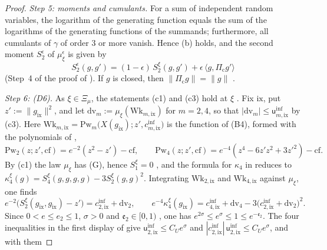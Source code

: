 \documentclass[11pt]{amsart}
\theoremstyle{definition}
\begin{document}
\begin{proof}
\emph{Step 5: moments and cumulants.}
For a sum of independent random variables, the logarithm of the generating function equals the sum of the logarithms of the generating functions of the summands; furthermore, all cumulants of $\gamma$ of order $3$ or more vanish.
Hence (b) holds, and the second moment $S_2^\epsilon$ of $\mu_\xi^\epsilon$ is given by
\begin{equation*}
S_2^{\epsilon}(g,g')=(1-\epsilon)\,S_2^\xi(g,g')+\epsilon\,\langle g,\Pi_{\mathrm c}g'\rangle
\end{equation*}
(Step~4 of the proof of \cite[Proposition~21.40\,(a)]{QEDI}).
If $g$ is closed, then $\|\Pi_{\mathrm c}g\|=\|g\|$ \cite[Lemma~9.12\,(a)]{QEDI}.

\emph{Step 6: (D6).}
As $\xi\in\Xi_\mu$, the statements (c1) and (c3) hold at $\xi$ \cite[Theorem~44\,(D)]{QEDIII}.
Fix $\mathrm{ix}$, put $z':=\|g_{\mathrm{ix}}\|^2$, and let $\mathrm{dv}_m:=\mu_\xi(\mathrm{Wk}_{m,\mathrm{ix}})$ for $m=2,4$, so that $|\mathrm{dv}_m|\le\mathsf u^{\mathrm{inf}}_{m,\mathrm{ix}}$ by (c3).
Here $\mathrm{Wk}_{m,\mathrm{ix}}=\allowbreak \mathrm{Pw}_m\bigl(X(g_{\mathrm{ix}});z',\allowbreak c^{\mathrm{inf}}_{m,\mathrm{ix}}\bigr)$ is the function of (B4), formed with the polynomials of \cite[Section~I.7.6]{QEDIII},
\begin{equation*}
\mathrm{Pw}_2(z;z',\mathrm{cf})=e^{-2}(z^2-z')-\mathrm{cf},\qquad\mathrm{Pw}_4(z;z',\mathrm{cf})=e^{-4}(z^4-6z'z^2+3z'^2)-\mathrm{cf}.
\end{equation*}
By (c1) the law $\mu_\xi$ has (G), hence $S_1^\xi=0$ \cite[Proposition~45.2\,(1), (8)]{QEDIII}, and the formula for $\kappa_4$ in \cite[(n5)]{QEDIII} reduces to $\kappa_4^\xi(g)=S_4^\xi(g,g,g,g)-3S_2^\xi(g,g)^2$.
Integrating $\mathrm{Wk}_{2,\mathrm{ix}}$ and $\mathrm{Wk}_{4,\mathrm{ix}}$ against $\mu_\xi$, one finds
\begin{equation*}
e^{-2}\bigl(S_2^\xi(g_{\mathrm{ix}},g_{\mathrm{ix}})-z'\bigr)=c^{\mathrm{inf}}_{2,\mathrm{ix}}+\mathrm{dv}_2,\qquad e^{-4}\kappa_4^\xi(g_{\mathrm{ix}})=c^{\mathrm{inf}}_{4,\mathrm{ix}}+\mathrm{dv}_4-3\bigl(c^{\mathrm{inf}}_{2,\mathrm{ix}}+\mathrm{dv}_2\bigr)^2.
\end{equation*}
Since $0<e\le e_2\le1$, $\sigma>0$ and $\mathfrak e_2\in[0,1)$ \cite[Proposition~43.2]{QEDIII}, one has $e^{2\sigma}\le e^\sigma\le1\le e^{-\mathfrak e_2}$.
The four inequalities in the first display of \cite[Theorem~44\,(B4)]{QEDIII} give $\mathsf u^{\mathrm{inf}}_{2,\mathrm{ix}}\le C_Ue^\sigma$ and $|c^{\mathrm{inf}}_{2,\mathrm{ix}}|\,\allowbreak \mathsf u^{\mathrm{inf}}_{2,\mathrm{ix}}\le C_Ue^\sigma$, and with them

\end{proof}
\end{document}
